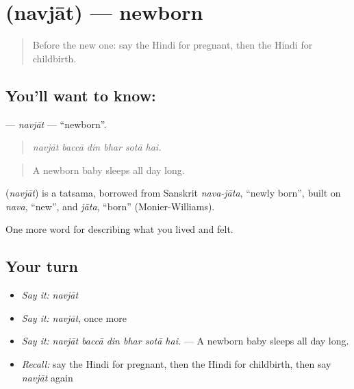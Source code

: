 \section[\texorpdfstring{\hi{नवजात} (navjāt)}{नवजात (navjāt)}]{ (navjāt) — newborn}

\label{lesson:HI-C497-navjat}



\begin{quote}
Before the new one: say the Hindi for pregnant, then the Hindi for childbirth.
\end{quote}

\subsection*{You'll want to know: }
\textbf{} — \emph{navjāt} — \textquotedblleft{}newborn\textquotedblright{}.

\begin{quote}
     
\end{quote}

\begin{quote}
\emph{navjāt baccā din bhar sotā hai.}
\end{quote}

\begin{quote}
A newborn baby sleeps all day long.
\end{quote}

\begin{cousinweb}
\textbf{} (\emph{navjāt}) is a tatsama, borrowed from Sanskrit \emph{nava-jāta}, \textquotedblleft{}newly born\textquotedblright{}, built on \emph{nava}, \textquotedblleft{}new\textquotedblright{}, and \emph{jāta}, \textquotedblleft{}born\textquotedblright{} (Monier-Williams).
\end{cousinweb}

\begin{grammarlens}[title={What you've built}]
One more word for describing what you lived and felt.
\end{grammarlens}

\subsection*{Your turn}
\begin{itemize}
\raggedright
  \item \emph{Say it:} \emph{navjāt}
  \item \emph{Say it:} \emph{navjāt}, once more
  \item \emph{Say it:} \emph{navjāt baccā din bhar sotā hai.} — A newborn baby sleeps all day long.
  \item \emph{Recall:} say the Hindi for pregnant, then the Hindi for childbirth, then say \emph{navjāt} again
\end{itemize}

